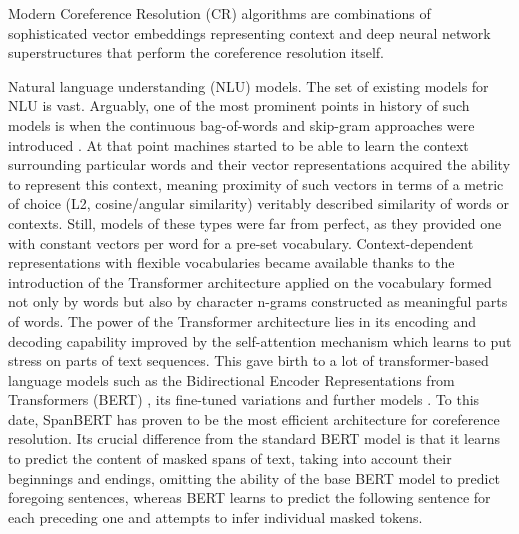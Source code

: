 Modern Coreference Resolution (CR) algorithms are combinations of sophisticated vector embeddings representing context and deep neural network superstructures that perform the coreference resolution itself. 

Natural language understanding (NLU) models. 
The set of existing models for NLU is vast. 
Arguably, one of the most prominent points in history of such models is when the continuous bag-of-words and skip-gram approaches were introduced \cite{w2v-Mikolov2013}. 
At that point machines started to be able to learn the context surrounding particular words and their vector representations  acquired the ability to represent this context, meaning proximity of such vectors in terms of a metric of choice (L2, cosine/angular similarity) veritably described similarity of words or contexts. 
Still, models of these types were far from perfect, as they provided one with constant vectors per word for a pre-set vocabulary. 
Context-dependent representations with flexible vocabularies became available thanks to the introduction of the Transformer architecture \cite{transformer-Vaswani2017} applied on the vocabulary formed not only by words but also by character n-grams constructed as meaningful parts of words.  
The power of the Transformer architecture lies in its encoding and decoding capability improved by the self-attention mechanism which learns to put stress on parts of text sequences. 
This gave birth to a lot of transformer-based language models such as the Bidirectional Encoder Representations from Transformers (BERT) \cite{bert-Devlin2019}, its fine-tuned variations \cite{albert-Lan2020,robarta-Liu2019} and further models \cite{gpt-Radford2018,use-Cer2018}. 
To this date, SpanBERT \cite{cr-Joshi2019} has proven to be the most efficient architecture for coreference resolution. 
Its crucial difference from the standard BERT model is that it learns to predict the content of masked spans of text, taking into account their beginnings and endings, omitting the ability of the base BERT model to predict foregoing  sentences, whereas BERT learns to predict the following sentence for each preceding one and attempts to infer individual masked tokens. 

